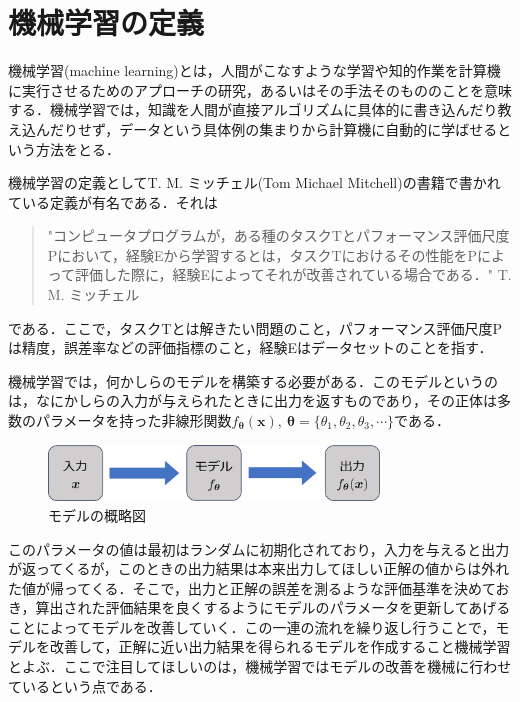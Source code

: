 \documentclass[a4paper,11pt]{jsreport}
\begin{document}
\section{機械学習の定義}
機械学習(machine learning)とは，人間がこなすような学習や知的作業を計算機に実行させるためのアプローチの研究，あるいはその手法そのもののことを意味する．機械学習では，知識を人間が直接アルゴリズムに具体的に書き込んだり教え込んだりせず，データという具体例の集まりから計算機に自動的に学ばせるという方法をとる．\par
機械学習の定義としてT. M. ミッチェル(Tom Michael Mitchell)の書籍\cite{Tom1997Machine}で書かれている定義が有名である．それは
\begin{quote}
  "コンピュータプログラムが，ある種のタスクTとパフォーマンス評価尺度Pにおいて，経験Eから学習するとは，タスクTにおけるその性能をPによって評価した際に，経験Eによってそれが改善されている場合である．"
  \hfill T. M. ミッチェル
\end{quote}
である．ここで，タスクTとは解きたい問題のこと，パフォーマンス評価尺度Pは精度，誤差率などの評価指標のこと，経験Eはデータセットのことを指す．\par
機械学習では，何かしらのモデルを構築する必要がある．このモデルというのは，なにかしらの入力が与えられたときに出力を返すものであり，その正体は多数のパラメータを持った非線形関数$f_{\bm{\theta}}(\bm{x}), \ \bm{\theta} = \{ \theta_1, \theta_2, \theta_3, \cdots \}$である．
\begin{figure}[b]
  \begin{center}
    \includegraphics[height=1.5cm]{image/モデル概略図.png}
    \caption{モデルの概略図}
  \end{center}
\end{figure}
このパラメータの値は最初はランダムに初期化されており，入力を与えると出力が返ってくるが，このときの出力結果は本来出力してほしい正解の値からは外れた値が帰ってくる．そこで，出力と正解の誤差を測るような評価基準を決めておき，算出された評価結果を良くするようにモデルのパラメータを更新してあげることによってモデルを改善していく．この一連の流れを繰り返し行うことで，モデルを改善して，正解に近い出力結果を得られるモデルを作成すること機械学習とよぶ．ここで注目してほしいのは，機械学習ではモデルの改善を機械に行わせているという点である．\par
\end{document}
